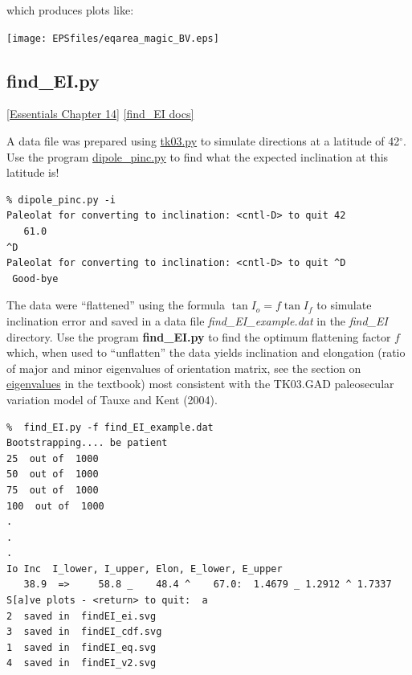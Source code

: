 \documentclass[11pt]{book}
\begin{document}
{{which produces plots like:

 \texttt{[image: EPSfiles/eqarea\_magic\_BV.eps]}






\subsection{find\_EI.py}
 \href{http://earthref.org/MAGIC/books/Tauxe/Essentials/WebBook3ch14.html#ch14}{ [Essentials Chapter 14]}%
\href{https://github.com/PmagPy/PmagPy/blob/master/programs/find_EI.py}{[find\_EI docs]}

A data file was prepared using \href{#tk03}{tk03.py} to simulate directions at a latitude of 42$^{\circ}$.   Use the program \href{#dipole_pinc.py}{dipole\_pinc.py} to find what the expected inclination at this latitude is!

\begin{verbatim}
% dipole_pinc.py -i
Paleolat for converting to inclination: <cntl-D> to quit 42
   61.0
^D
Paleolat for converting to inclination: <cntl-D> to quit ^D
 Good-bye
\end{verbatim}


The data were ``flattened'' using the formula $ \tan I_o = f \tan I_f$ to simulate inclination error and saved in a data file {\it find\_EI\_example.dat} in the {\it find\_EI} directory.
Use the program {\bf find\_EI.py} to find the optimum flattening factor $f$ which, when used to ``unflatten'' the data  yields inclination   and  elongation (ratio of major and minor eigenvalues of orientation matrix, see the section on  \href{Webbook2.html#orientation_tensor}{eigenvalues} in the textbook)  most consistent with the TK03.GAD paleosecular variation model of Tauxe and Kent (2004). \nocite{tauxe04d}


\begin{verbatim}
%  find_EI.py -f find_EI_example.dat
Bootstrapping.... be patient
25  out of  1000
50  out of  1000
75  out of  1000
100  out of  1000
.
.
.
Io Inc  I_lower, I_upper, Elon, E_lower, E_upper
   38.9  =>     58.8 _    48.4 ^    67.0:  1.4679 _ 1.2912 ^ 1.7337
S[a]ve plots - <return> to quit:  a
2  saved in  findEI_ei.svg
3  saved in  findEI_cdf.svg
1  saved in  findEI_eq.svg
4  saved in  findEI_v2.svg



\end{verbatim}}}
\end{document}
